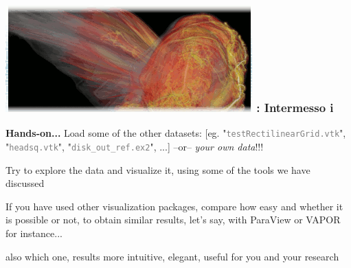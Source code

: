 \handsonEnv
\begin{frame}
\frametitle{\href{https://wci.llnl.gov/simulation/computer-codes/visit/}{\includegraphics[height=.85cm]{figs/visit-logos/VisIt-03}} \hspace{-.85cm}{\bf \textcolor{lightgray}{VisIt}}: Intermesso i}

\vspace{-1mm}
\begin{beamerboxesrounded}[upper=block head,lower=block body,shadow=true]{\bf Hands-on...}%
        \textcolor{DarkGreen}{} Load some of the other datasets: 
                [eg. {\small "\textcolor{gray}{\texttt{testRectilinearGrid.vtk}}", "\textcolor{gray}{\texttt{headsq.vtk}}", "\textcolor{gray}{\texttt{disk\_out\_ref.ex2}}", ...}]
                --or-- \textit{your own data}!!!

        \pause
        \textcolor{DarkGreen}{} Try to explore the data and visualize it, using some of the tools we have discussed

	\pause
        \textcolor{DarkGreen}{} If you have used other visualization packages, compare how easy and 
                whether it is possible or not, to obtain similar results, let's say, with ParaView or VAPOR for instance...

        \textcolor{DarkGreen}{} also which one, results more intuitive, elegant, useful for you and your research
\end{beamerboxesrounded}


\end{frame}

